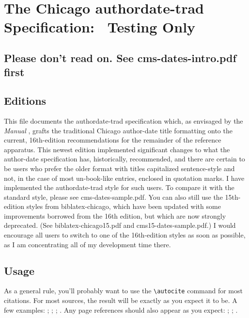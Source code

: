 \documentclass[a4paper,12pt]{report}
\newcommand{\cmd}[1]{\texttt{\textbackslash #1}}
\begin{document}
\section*{The Chicago authordate-trad Specification:%
  \ Testing Only}
\label{sec:spec}

\subsection*{Please don't read on. See cms-dates-intro.pdf first}
\label{bibernote}

\subsection*{Editions}
\label{editions}

This file documents the \textsf{authordate-trad} specification which,
as envisaged by the \emph{Manual} \autocite*[15.45]{chicago:manual},
grafts the traditional Chicago author-date title formatting onto the
current, 16th-edition recommendations for the remainder of the
reference apparatus.  This newest edition implemented significant
changes to what the author-date specification has, historically,
recommended, and there are certain to be users who prefer the older
format with titles capitalized sentence-style and not, in the case of
most un-book-like entries, enclosed in quotation marks.  I have
implemented the \textsf{authordate-trad} style for such users.  To
compare it with the standard style, please see
\textsf{cms-dates-sample.pdf}.  You can also still use the
15th-edition styles from \textsf{biblatex-chicago}, which have been
updated with some improvements borrowed from the 16th edition, but
which are now strongly deprecated.  (See
\textsf{biblatex-chicago15.pdf} and \textsf{cms15-dates-sample.pdf}.)
I would encourage all users to switch to one of the 16th-edition
styles as soon as possible, as I am concentrating all of my
development time there.

\subsection*{Usage}
\label{usage}

As a general rule, you'll probably want to use the \cmd{autocite}
command for most citations.  For most sources, the result will be
exactly as you expect it to be.  A few examples:
\autocite{adorno:benj}; \autocite{ashbrook:brain};
\autocite{babb:peru}; \autocite{barcott:review:15}.  Any page
references should also appear as you expect: \autocite[338]{batson};
\autocite[79]{beattie:crime}; \autocite[36]{boxer:china}.
\end{document}
